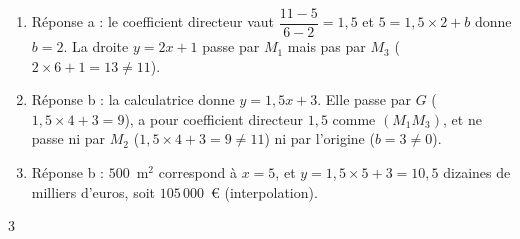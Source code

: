 {\begin{enumerate}
\item Réponse a : le coefficient directeur vaut $\dfrac{11-5}{6-2}=1{,}5$ et $5=1{,}5\times2+b$ donne $b=2$. La droite $y=2x+1$ passe par $M_1$ mais pas par $M_3$ ($2\times6+1=13\neq11$).
\item Réponse b : la calculatrice donne $y=1{,}5x+3$. Elle passe par $G$ ($1{,}5\times4+3=9$), a pour coefficient directeur $1{,}5$ comme $(M_1M_3)$, et ne passe ni par $M_2$ ($1{,}5\times4+3=9\neq11$) ni par l'origine ($b=3\neq0$).
\item Réponse b : $500$~m$^2$ correspond à $x=5$, et $y=1{,}5\times5+3=10{,}5$ dizaines de milliers d'euros, soit $105\,000$~€ (interpolation).
\end{enumerate}
}{3}

